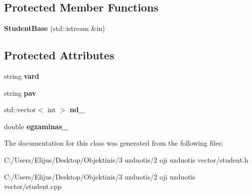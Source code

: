 \subsection*{Protected Member Functions}
\begin{DoxyCompactItemize}
\item 
\mbox{\label{class_student_base_ac662cd3032afaab8f9b59d45fff019a4}} 
{\bfseries Student\+Base} (std\+::istream \&in)
\end{DoxyCompactItemize}
\subsection*{Protected Attributes}
\begin{DoxyCompactItemize}
\item 
\mbox{\label{class_student_base_a43bacd79e942bdf9d2fb984d08edf454}} 
string {\bfseries vard}
\item 
\mbox{\label{class_student_base_abdccea3079f2c5df94f35525d4c5c75d}} 
string {\bfseries pav}
\item 
\mbox{\label{class_student_base_ab55fd8db43909de908c66ed7f3bdd4e6}} 
std\+::vector$<$ int $>$ {\bfseries nd\+\_\+}
\item 
\mbox{\label{class_student_base_a570c3b4ff3d867280b15cf4d680a6cf7}} 
double {\bfseries egzaminas\+\_\+}
\end{DoxyCompactItemize}


The documentation for this class was generated from the following files\+:\begin{DoxyCompactItemize}
\item 
C\+:/\+Users/\+Elijus/\+Desktop/\+Objektinis/3 uzduotis/2 oji uzduotis vector/student.\+h\item 
C\+:/\+Users/\+Elijus/\+Desktop/\+Objektinis/3 uzduotis/2 oji uzduotis vector/student.\+cpp\end{DoxyCompactItemize}
